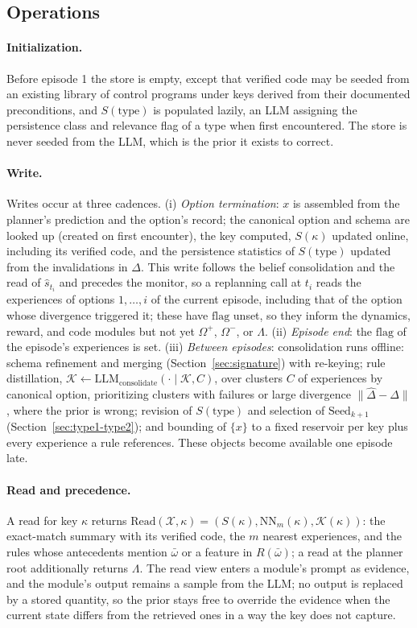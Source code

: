 \documentclass[10pt]{article}
\newcommand{\llm}[1]{\mathrm{LLM}_{\mathrm{#1}}}
\newcommand{\calK}{\mathcal{K}}
\newcommand{\calX}{\mathcal{X}}
\newcommand{\Rel}{R}
\newcommand{\shat}{\hat{s}}
\newcommand{\Read}{\mathrm{Read}}
\newcommand{\type}{\mathrm{type}}
\begin{document}
\subsection{Operations}
\label{sec:type2-ops}

\paragraph{Initialization.}
Before episode 1 the store is empty, except that verified code may be seeded from an existing library of control programs under keys derived from their documented preconditions, and $S(\type)$ is populated lazily, an LLM assigning the persistence class and relevance flag of a type when first encountered. The store is never seeded from the LLM, which is the prior it exists to correct.

\paragraph{Write.}
Writes occur at three cadences. (i) \emph{Option termination}: $x$ is assembled from the planner's prediction and the option's record; the canonical option and schema are looked up (created on first encounter), the key computed, $S(\kappa)$ updated online, including its verified code, and the persistence statistics of $S(\type)$ updated from the invalidations in $\Delta$. This write follows the belief consolidation and the read of $\shat_{t_i}$ and precedes the monitor, so a replanning call at $t_i$ reads the experiences of options $1,\dots,i$ of the current episode, including that of the option whose divergence triggered it; these have $\mathrm{flag}$ unset, so they inform the dynamics, reward, and code modules but not yet $\Omega^{+}$, $\Omega^{-}$, or $\Lambda$. (ii) \emph{Episode end}: the $\mathrm{flag}$ of the episode's experiences is set. (iii) \emph{Between episodes}: consolidation runs offline: schema refinement and merging (Section~\ref{sec:signature}) with re-keying; rule distillation, $\calK\leftarrow\llm{consolidate}(\cdot\mid\calK,C)$, over clusters $C$ of experiences by canonical option, prioritizing clusters with failures or large divergence $\|\hat\Delta-\Delta\|$, where the prior is wrong; revision of $S(\type)$ and selection of $\mathrm{Seed}_{k+1}$ (Section~\ref{sec:type1-type2}); and bounding of $\{x\}$ to a fixed reservoir per key plus every experience a rule references. These objects become available one episode late.

\paragraph{Read and precedence.}
A read for key $\kappa$ returns $\Read(\calX,\kappa)=(S(\kappa),\mathrm{NN}_m(\kappa),\calK(\kappa))$: the exact-match summary with its verified code, the $m$ nearest experiences, and the rules whose antecedents mention $\bar\omega$ or a feature in $\Rel(\bar\omega)$; a read at the planner root additionally returns $\Lambda$. The read view enters a module's prompt as evidence, and the module's output remains a sample from the LLM; no output is replaced by a stored quantity, so the prior stays free to override the evidence when the current state differs from the retrieved ones in a way the key does not capture.
\end{document}
